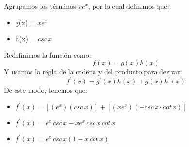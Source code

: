 \documentclass{article}
\begin{document}
\begin{enumerate}[start=5, label=\textbf{\arabic*.}]
    Agrupamos los términos $ xe^x$, por lo cual definimos que:
    \begin{itemize}
        \item g(x) = $xe^x$
        \item h(x) = $csc\,x$
    \end{itemize}
    Redefinimos la función como:
    \[
        f(x) = g(x)h(x)
    \]
    Y usamos la regla de la cadena y del producto para derivar:
    \[
        f^{\prime}(x) = g^{\prime}(x)h(x) + g(x)h^{\prime}(x)
    \]
    De este modo, tenemos que:
    \begin{itemize}
        \item $f^{\prime}(x) = [(e^x)(csc\,x)] + [(xe^x)(-csc\,x\cdot cot\,x)]$
        \item $f^{\prime}(x) = e^x\,csc\,x - xe^x\,csc\,x\,cot\,x$
        \item $f^{\prime}(x) = e^x\,csc\,x(1 - x\,cot\,x)$
    \end{itemize}
    \vspace{0.5em}

    \end{enumerate}
\end{document}
